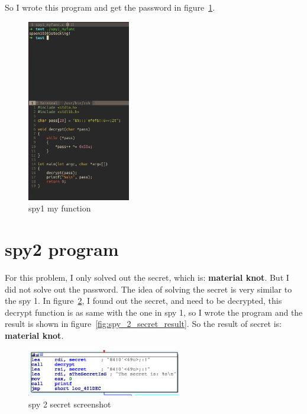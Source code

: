 \documentclass{article}
\theoremstyle{remark}
\theoremstyle{definition}
\begin{document}
    So I wrote this program and get the password in figure~\ref{fig:spy1_myfunc}.

    \begin{figure}[!htbp]
        \centering
        \includegraphics[width=0.4\textwidth]{img/spy1_myfunc.png}
        \caption{spy1 my function}
        \label{fig:spy1_myfunc}
    \end{figure}


    \section{spy2 program}
    For this problem, I only solved out the secret, which is: \textbf{material knot}. But I did not solve out the password. The idea of solving the secret is very similar to the spy 1. In figure~\ref{fig:spy2_secret}, I found out the secret, and need to be decrypted, this decrypt function is as same with the one in spy 1, so I wrote the program and the result is shown in figure~\ref{fig:spy_2_secret_result}. So the result of secret is: \textbf{material knot}.

    \begin{figure}[!htbp]
        \centering
        \includegraphics[width=0.6\textwidth]{img/spy2_secret.png}
        \caption{spy 2 secret screenshot}
        \label{fig:spy2_secret}
    \end{figure}
\end{document}
